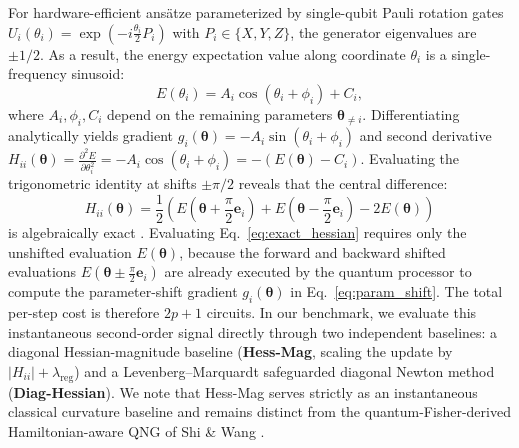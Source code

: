 \documentclass[11pt,a4paper]{article}
\begin{document}
For hardware-efficient ans\"atze parameterized by single-qubit Pauli rotation gates $U_i(\theta_i) = \exp(-i \frac{\theta_i}{2} P_i)$ with $P_i \in \{X, Y, Z\}$, the generator eigenvalues are $\pm 1/2$. As a result, the energy expectation value along coordinate $\theta_i$ is a single-frequency sinusoid:
\begin{equation}
E(\theta_i) = A_i \cos(\theta_i + \phi_i) + C_i,
\label{eq:sinusoid_form}
\end{equation}
where $A_i, \phi_i, C_i$ depend on the remaining parameters $\boldsymbol{\theta}_{\ne i}$. Differentiating analytically yields gradient $g_i(\boldsymbol{\theta}) = -A_i \sin(\theta_i + \phi_i)$ and second derivative $H_{ii}(\boldsymbol{\theta}) = \frac{\partial^2 E}{\partial \theta_i^2} = -A_i \cos(\theta_i + \phi_i) = -(E(\boldsymbol{\theta}) - C_i)$. Evaluating the trigonometric identity at shifts $\pm \pi/2$ reveals that the central difference:
\begin{equation}
H_{ii}(\boldsymbol{\theta}) = \frac{1}{2}\left(E\left(\boldsymbol{\theta} + \frac{\pi}{2}\mathbf{e}_i\right) + E\left(\boldsymbol{\theta} - \frac{\pi}{2}\mathbf{e}_i\right) - 2E(\boldsymbol{\theta})\right)
\label{eq:exact_hessian}
\end{equation}
is algebraically exact \cite{wierichs2022general}. Evaluating Eq.~\eqref{eq:exact_hessian} requires only the unshifted evaluation $E(\boldsymbol{\theta})$, because the forward and backward shifted evaluations $E(\boldsymbol{\theta} \pm \frac{\pi}{2}\mathbf{e}_i)$ are already executed by the quantum processor to compute the parameter-shift gradient $g_i(\boldsymbol{\theta})$ in Eq.~\eqref{eq:param_shift}. The total per-step cost is therefore $2p+1$ circuits. In our benchmark, we evaluate this instantaneous second-order signal directly through two independent baselines: a diagonal Hessian-magnitude baseline (\textbf{Hess-Mag}, scaling the update by $|H_{ii}| + \lambda_{\text{reg}}$) and a Levenberg--Marquardt safeguarded diagonal Newton method (\textbf{Diag-Hessian}). We note that Hess-Mag serves strictly as an instantaneous classical curvature baseline and remains distinct from the quantum-Fisher-derived Hamiltonian-aware QNG of Shi \& Wang \cite{shi2025hamiltonian}.
\end{document}
